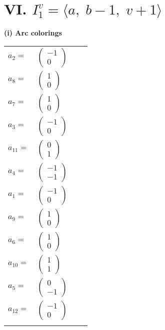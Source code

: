 \documentclass[1p]{elsarticle_modified}
\theoremstyle{definition}
\begin{document}
\centering \section*{VI. $I^v_{1}= \langle a,\;b-1,\;v+1 \rangle$}
\flushleft \textbf{(i) Arc colorings}\\
\begin{tabular}{m{7pt} m{180pt} m{7pt} m{180pt} }
\flushright $a_{2}=$&$\begin{pmatrix}-1\\0\end{pmatrix}$ \\
\flushright $a_{8}=$&$\begin{pmatrix}1\\0\end{pmatrix}$ \\
\flushright $a_{7}=$&$\begin{pmatrix}1\\0\end{pmatrix}$ \\
\flushright $a_{3}=$&$\begin{pmatrix}-1\\0\end{pmatrix}$ \\
\flushright $a_{11}=$&$\begin{pmatrix}0\\1\end{pmatrix}$ \\
\flushright $a_{4}=$&$\begin{pmatrix}-1\\-1\end{pmatrix}$ \\
\flushright $a_{1}=$&$\begin{pmatrix}-1\\0\end{pmatrix}$ \\
\flushright $a_{9}=$&$\begin{pmatrix}1\\0\end{pmatrix}$ \\
\flushright $a_{6}=$&$\begin{pmatrix}1\\0\end{pmatrix}$ \\
\flushright $a_{10}=$&$\begin{pmatrix}1\\1\end{pmatrix}$ \\
\flushright $a_{5}=$&$\begin{pmatrix}0\\-1\end{pmatrix}$ \\
\flushright $a_{12}=$&$\begin{pmatrix}-1\\0\end{pmatrix}$\\&\end{tabular}
\end{document}

